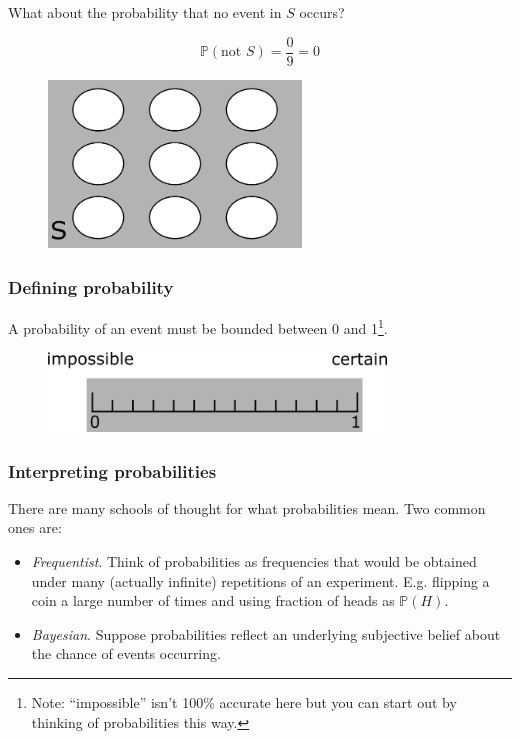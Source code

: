 \documentclass{beamer}
\begin{document}
	\begin{frame}
		What about the probability that no event in $S$ occurs?
		
		\begin{equation}
			\mathbb{P}(\text{not }S) = \frac{0}{9} = 0
		\end{equation}
		
		\begin{figure}[ht]
			\centerline{\includegraphics[width=0.6\textwidth]{./figures/pebble_world_probnots.png}}
		\end{figure}
		
	\end{frame}

	\begin{frame}
		\frametitle{Defining probability}
		
		A probability of an event must be bounded between 0 and 1\footnote{Note: ``impossible'' isn't 100\% accurate here but you can start out by thinking of probabilities this way.}.
		
		\begin{figure}[ht]
			\centerline{\includegraphics[width=0.8\textwidth]{./figures/probability.png}}
		\end{figure}
		
	\end{frame}

	\begin{frame}
		\frametitle{Interpreting probabilities}
		
		There are many schools of thought for what probabilities mean. Two common ones are:
		
		\begin{itemize}
			\item \textit{Frequentist}. Think of probabilities as frequencies that would be obtained under many (actually infinite) repetitions of an experiment. E.g. flipping a coin a large number of times and using fraction of heads as $\mathbb{P}(H)$.
			\item \textit{Bayesian}. Suppose probabilities reflect an underlying subjective belief about the chance of events occurring.
		\end{itemize}
		
	\end{frame}
\end{document}
